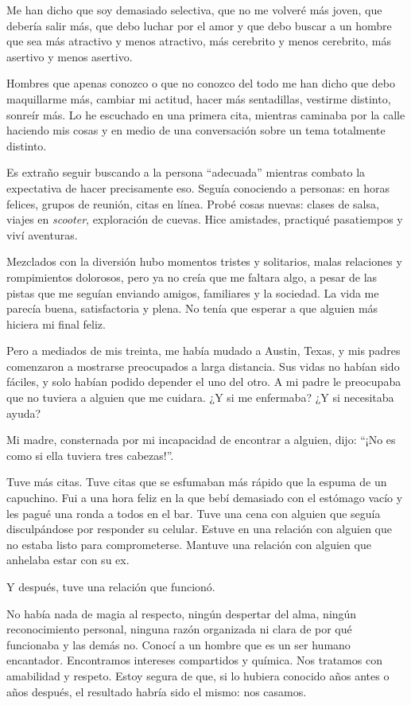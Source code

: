 Me han dicho que soy demasiado selectiva, que no me volveré más joven,
que debería salir más, que debo luchar por el amor y que debo buscar a
un hombre que sea más atractivo y menos atractivo, más cerebrito y menos
cerebrito, más asertivo y menos asertivo.

Hombres que apenas conozco o que no conozco del todo me han dicho que
debo maquillarme más, cambiar mi actitud, hacer más sentadillas,
vestirme distinto, sonreír más. Lo he escuchado en una primera cita,
mientras caminaba por la calle haciendo mis cosas y en medio de una
conversación sobre un tema totalmente distinto.

Es extraño seguir buscando a la persona ``adecuada'' mientras combato la
expectativa de hacer precisamente eso. Seguía conociendo a personas: en
horas felices, grupos de reunión, citas en línea. Probé cosas nuevas:
clases de salsa, viajes en \emph{scooter}, exploración de cuevas. Hice
amistades, practiqué pasatiempos y viví aventuras.

Mezclados con la diversión hubo momentos tristes y solitarios, malas
relaciones y rompimientos dolorosos, pero ya no creía que me faltara
algo, a pesar de las pistas que me seguían enviando amigos, familiares y
la sociedad. La vida me parecía buena, satisfactoria y plena. No tenía
que esperar a que alguien más hiciera mi final feliz.

Pero a mediados de mis treinta, me había mudado a Austin, Texas, y mis
padres comenzaron a mostrarse preocupados a larga distancia. Sus vidas
no habían sido fáciles, y solo habían podido depender el uno del otro. A
mi padre le preocupaba que no tuviera a alguien que me cuidara. ¿Y si me
enfermaba? ¿Y si necesitaba ayuda?

Mi madre, consternada por mi incapacidad de encontrar a alguien, dijo:
``¡No es como si ella tuviera tres cabezas!''.

Tuve más citas. Tuve citas que se esfumaban más rápido que la espuma de
un capuchino. Fui a una hora feliz en la que bebí demasiado con el
estómago vacío y les pagué una ronda a todos en el bar. Tuve una cena
con alguien que seguía disculpándose por responder su celular. Estuve en
una relación con alguien que no estaba listo para comprometerse. Mantuve
una relación con alguien que anhelaba estar con su ex.

Y después, tuve una relación que funcionó.

No había nada de magia al respecto, ningún despertar del alma, ningún
reconocimiento personal, ninguna razón organizada ni clara de por qué
funcionaba y las demás no. Conocí a un hombre que es un ser humano
encantador. Encontramos intereses compartidos y química. Nos tratamos
con amabilidad y respeto. Estoy segura de que, si lo hubiera conocido
años antes o años después, el resultado habría sido el mismo: nos
casamos.

